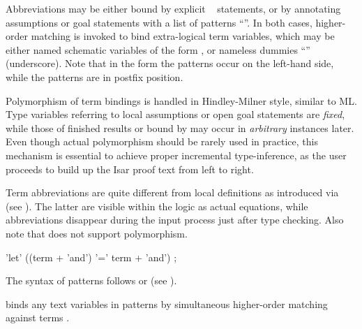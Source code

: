 \begin{isabellebody}
\begin{isamarkuptext}
  Abbreviations may be either bound by explicit \hyperlink{command.let}{\mbox{}}~ statements, or by annotating assumptions or
  goal statements with a list of patterns ``''.  In both cases, higher-order matching is invoked to
  bind extra-logical term variables, which may be either named
  schematic variables of the form , or nameless dummies
  ``\hyperlink{variable.underscore}{\mbox{\isa{{\isacharunderscore}}}}'' (underscore). Note that in the \hyperlink{command.let}{\mbox{}}
  form the patterns occur on the left-hand side, while the \hyperlink{keyword.is}{\mbox{}} patterns are in postfix position.

  Polymorphism of term bindings is handled in Hindley-Milner style,
  similar to ML.  Type variables referring to local assumptions or
  open goal statements are \emph{fixed}, while those of finished
  results or bound by \hyperlink{command.let}{\mbox{}} may occur in \emph{arbitrary}
  instances later.  Even though actual polymorphism should be rarely
  used in practice, this mechanism is essential to achieve proper
  incremental type-inference, as the user proceeds to build up the
  Isar proof text from left to right.

  \medskip Term abbreviations are quite different from local
  definitions as introduced via \hyperlink{command.def}{\mbox{}} (see
  ).  The latter are visible within the
  logic as actual equations, while abbreviations disappear during the
  input process just after type checking.  Also note that \hyperlink{command.def}{\mbox{}} does not support polymorphism.

  \begin{rail}
    'let' ((term + 'and') '=' term + 'and')
    ;  
  \end{rail}

  The syntax of \hyperlink{keyword.is}{\mbox{}} patterns follows 
  or  (see ).

  \begin{descr}

  \item [\hyperlink{command.let}{\mbox{\isa{\isacommand{let}}}}~\isa{{\isachardoublequote}p\isactrlsub {\isadigit{1}}\ {\isacharequal}\ t\isactrlsub {\isadigit{1}}\ {\isasymAND}\ {\isasymdots}\ p\isactrlsub n\ {\isacharequal}\ t\isactrlsub n{\isachardoublequote}}] binds any text variables in patterns  by simultaneous higher-order matching
  against terms .


\end{descr}
\end{isamarkuptext}
\end{isabellebody}
